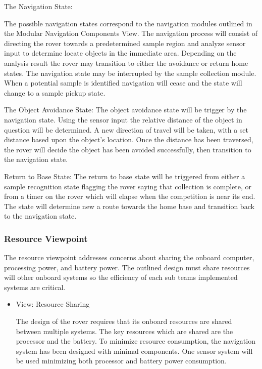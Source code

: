 \documentclass[10pt, oneside,onecolumn]{IEEEtran}
\begin{document}
\begin{titlepage}
\begin{itemize}
\subitem The Navigation State:

The possible navigation states correspond to the navigation modules outlined in the Modular Navigation Components View. The navigation process will consist of directing the rover towards a predetermined sample region and analyze sensor input to determine locate objects in the immediate area. Depending on the analysis result the rover may transition to either the avoidance or return home states. The navigation state may be interrupted by the sample collection module. When a potential sample is identified navigation will cease and the state will change to a sample pickup state. 

\subitem The Object Avoidance State: The object avoidance state will be trigger by the navigation state. Using the sensor input the relative distance of the object in question will be determined. A new direction of travel will be taken, with a set distance based upon the object's location. Once the distance has been traversed, the rover will decide the object has been avoided successfully, then transition to the navigation state.

\subitem Return to Base State: The return to base state will be triggered from either a sample recognition state flagging the rover saying that collection is complete, or from a timer on the rover which will elapse when the competition is near its end. The state will determine new a route towards the home base and transition back to the navigation state. 

\end{itemize}

\subsubsection{Resource Viewpoint}

The resource viewpoint addresses concerns about sharing the onboard computer, processing power, and battery power. The outlined design must share resources will other onboard systems so the efficiency of each sub teams implemented systems are critical.

\begin{itemize}

\item View: Resource Sharing

The design of the rover requires that its onboard resources are shared between multiple systems. The key resources which are shared are the processor and the battery. To minimize resource consumption, the navigation system has been designed with minimal components. One sensor system will be used minimizing both processor and battery power consumption.


\end{itemize}
\end{titlepage}
\end{document}
